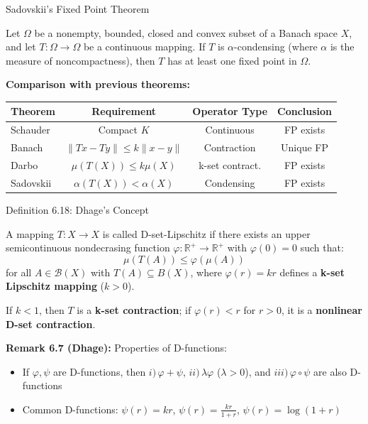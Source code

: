 \documentclass[aspectratio=169,10pt]{beamer}
\begin{document}
\begin{frame}{Sadovskii's Fixed Point Theorem}

\begin{theorem}
Let $\Omega$ be a nonempty, bounded, closed and convex subset of a Banach space $X$, and let $T: \Omega \to \Omega$ be a continuous mapping. If $T$ is $\alpha$-condensing (where $\alpha$ is the measure of noncompactness), then $T$ has at least one fixed point in $\Omega$.
\end{theorem}

\vspace{0.3cm}

\textbf{Comparison with previous theorems:}
\begin{center}
\begin{tabular}{|l|c|c|c|}
\hline
\textbf{Theorem} & \textbf{Requirement} & \textbf{Operator Type} & \textbf{Conclusion} \\
\hline
Schauder & Compact $K$ & Continuous & FP exists \\
Banach & $\|Tx - Ty\| \leq k\|x-y\|$ & Contraction & Unique FP \\
Darbo & $\mu(T(X)) \leq k\mu(X)$ & k-set contract. & FP exists \\
Sadovskii & $\alpha(T(X)) < \alpha(X)$ & Condensing & FP exists \\
\hline
\end{tabular}
\end{center}

\end{frame}

\begin{frame}{Definition 6.18: Dhage's Concept}

\begin{definition}
A mapping $T: X \to X$ is called \alert{D-set-Lipschitz} if there exists an upper semicontinuous nondecrasing function $\varphi: \mathbb{R}^+ \to \mathbb{R}^+$ with $\varphi(0) = 0$ such that:
\[
\mu(T(A)) \leq \varphi(\mu(A))
\]
for all $A \in \mathcal{B}(X)$ with $T(A) \subseteq B(X)$, where $\varphi(r) = kr$ defines a \textbf{k-set Lipschitz mapping} ($k > 0$).

If $k < 1$, then $T$ is a \textbf{k-set contraction}; if $\varphi(r) < r$ for $r > 0$, it is a \textbf{nonlinear D-set contraction}.
\end{definition}

\vspace{0.3cm}

\textbf{Remark 6.7 (Dhage):} Properties of D-functions:
\begin{itemize}
    \item If $\varphi, \psi$ are D-functions, then $i)\, \varphi + \psi$, $ii)\, \lambda\varphi$ ($\lambda > 0$), and $iii)\, \varphi \circ \psi$ are also D-functions
    \item Common D-functions: $\psi(r) = kr$, $\psi(r) = \frac{kr}{1+r}$, $\psi(r) = \log(1+r)$
\end{itemize}

\end{frame}
\end{document}
